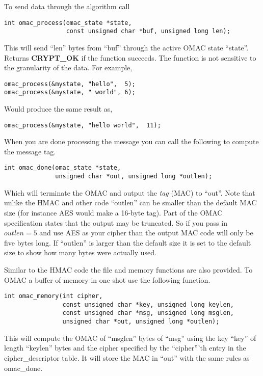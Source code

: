 \documentclass[b5paper]{book}
\begin{document}
To send data through the algorithm call
\begin{verbatim}
int omac_process(omac_state *state, 
                 const unsigned char *buf, unsigned long len);
\end{verbatim}
This will send ``len'' bytes from ``buf'' through the active OMAC state ``state''.  Returns \textbf{CRYPT\_OK} if the 
function succeeds.  The function is not sensitive to the granularity of the data.  For example,

\begin{verbatim}
omac_process(&mystate, "hello",  5);
omac_process(&mystate, " world", 6);
\end{verbatim}

Would produce the same result as,

\begin{verbatim}
omac_process(&mystate, "hello world",  11);
\end{verbatim}

When you are done processing the message you can call the following to compute the message tag.

\begin{verbatim}
int omac_done(omac_state *state, 
              unsigned char *out, unsigned long *outlen);
\end{verbatim}
Which will terminate the OMAC and output the \textit{tag} (MAC) to ``out''.  Note that unlike the HMAC and other code 
``outlen'' can be smaller than the default MAC size (for instance AES would make a 16-byte tag).  Part of the OMAC 
specification states that the output may be truncated.  So if you pass in $outlen = 5$ and use AES as your cipher than
the output MAC code will only be five bytes long.  If ``outlen'' is larger than the default size it is set to the default
size to show how many bytes were actually used.

Similar to the HMAC code the file and memory functions are also provided.  To OMAC a buffer of memory in one shot use the 
following function.

\begin{verbatim}
int omac_memory(int cipher, 
                const unsigned char *key, unsigned long keylen,
                const unsigned char *msg, unsigned long msglen,
                unsigned char *out, unsigned long *outlen);
\end{verbatim}
This will compute the OMAC of ``msglen'' bytes of ``msg'' using the key ``key'' of length ``keylen'' bytes and the cipher
specified by the ``cipher'''th entry in the cipher\_descriptor table.  It will store the MAC in ``out'' with the same
rules as omac\_done.
\end{document}
